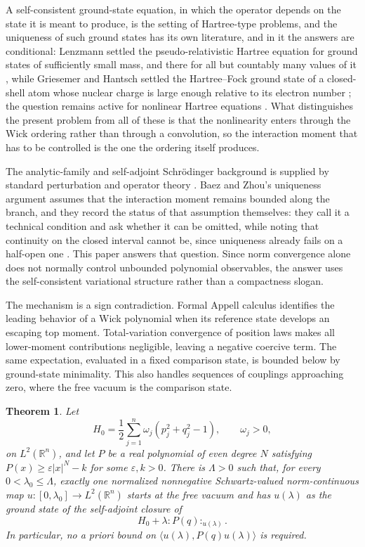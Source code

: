 \documentclass[11pt,reqno]{amsart}
\theoremstyle{plain}
\newtheorem{theorem}{Theorem}[section]
\theoremstyle{definition}
\theoremstyle{remark}
\numberwithin{equation}{section}
\begin{document}
A self-consistent ground-state equation, in which the operator depends on the
state it is meant to produce, is the setting of Hartree-type problems, and the
uniqueness of such ground states has its own literature, and in it the
answers are conditional: Lenzmann settled the pseudo-relativistic Hartree
equation for ground states of sufficiently small mass, and there for all but
countably many values of it \cite{Lenzmann_2009uo}, while Griesemer and
Hantsch settled the Hartree--Fock ground state of a closed-shell atom whose
nuclear charge is large enough relative to its electron number
\cite{Griesemer_2011us}; the question remains active for nonlinear Hartree
equations \cite{Luo_2018uo}.  What distinguishes the present problem
from all of these is that the nonlinearity enters through the Wick ordering
rather than through a convolution, so the interaction moment that has to be
controlled is the one the ordering itself produces.

The analytic-family and self-adjoint Schr\"odinger background is supplied by
standard perturbation and operator theory
\cite{Kato_Book,ReedSimonII,Simon_1970cc}.  Baez and Zhou's uniqueness
argument assumes that the interaction moment remains bounded along the
branch, and they record the status of that assumption themselves: they call
it a technical condition and ask whether it can be omitted, while noting that
continuity on the closed interval cannot be, since uniqueness already fails
on a half-open one \cite{BaezZhou1992}.  This paper answers that
question.  Since norm convergence alone does not normally control unbounded
polynomial observables, the answer uses the self-consistent variational
structure rather than a compactness slogan.

The mechanism is a sign contradiction.  Formal Appell calculus identifies
the leading behavior of a Wick polynomial when its reference state develops
an escaping top moment.  Total-variation convergence of position laws makes
all lower-moment contributions negligible, leaving a negative coercive term.
The same expectation, evaluated in a fixed comparison state, is bounded
below by ground-state minimality.  This also handles sequences of couplings
approaching zero, where the free vacuum is the comparison state.

\begin{theorem}\label{thm:moment-control}
Let
\[
H_0=\frac12\sum_{j=1}^n\omega_j(p_j^2+q_j^2-1),\qquad \omega_j>0,
\]
on $L^2(\mathbb R^n)$, and let $P$ be a real polynomial of even degree
$N$ satisfying $P(x)\ge\varepsilon|x|^N-k$ for some
$\varepsilon,k>0$.  There is $\Lambda>0$ such that, for every
$0<\lambda_0\le\Lambda$, exactly one normalized nonnegative
Schwartz-valued norm-continuous map
$u:[0,\lambda_0]\to L^2(\mathbb R^n)$ starts at the free vacuum and has
$u(\lambda)$ as the ground state of the self-adjoint closure of
\[
H_0+\lambda:P(q):_{u(\lambda)}.
\]
In particular, no a priori bound on
$\langle u(\lambda),P(q)u(\lambda)\rangle$ is required.
\end{theorem}
\end{document}
